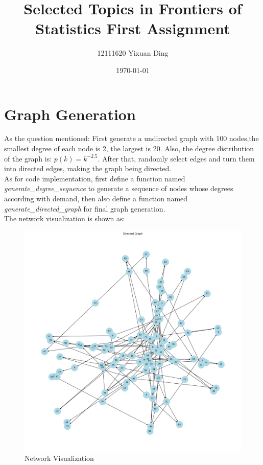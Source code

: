 \documentclass{article}
\begin{document}
	
	\title{Selected Topics in Frontiers of Statistics First Assignment}
	\author{12111620 Yixuan Ding}
	\date{\today}
	\maketitle
	\section*{Graph Generation}
	As the question mentioned: First generate a undirected graph with 100 nodes,the smallest degree of each node is 2, the largest is 20. Also, the degree distribution of the graph is: $p(k) = k^{-2.5}$. After that, randomly select edges and turn them into directed edges, making the graph being directed.\\
	As for code implementation, first define a function named \textit{generate\_degree\_sequence} to generate a sequence of nodes whose degrees according with demand, then also define a function named \textit{generate\_directed\_graph} for final graph generation.\\
	The network visualization is shown as:
	\begin{figure}[H]
		\centering
		\includegraphics[scale=0.32]{network.png}
		\caption{Network Visualization}
	\end{figure}
	
\end{document}
